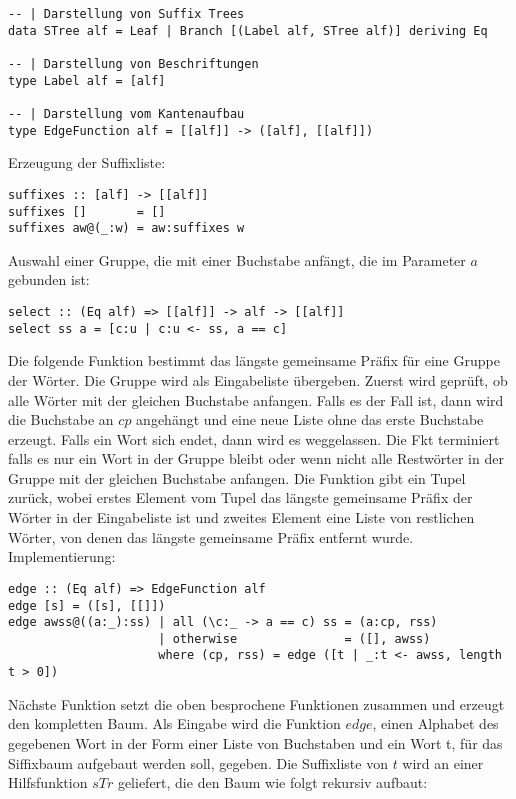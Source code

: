 \documentclass[12pt]{report}
\begin{document}
\begin{lstlisting}
-- | Darstellung von Suffix Trees
data STree alf = Leaf | Branch [(Label alf, STree alf)] deriving Eq

-- | Darstellung von Beschriftungen
type Label alf = [alf]

-- | Darstellung vom Kantenaufbau
type EdgeFunction alf = [[alf]] -> ([alf], [[alf]])
\end{lstlisting}

Erzeugung der Suffixliste:
\begin{lstlisting}
suffixes :: [alf] -> [[alf]]
suffixes []       = []
suffixes aw@(_:w) = aw:suffixes w
\end{lstlisting}

Auswahl einer Gruppe, die mit einer Buchstabe anfängt, die im Parameter $a$ gebunden ist:
\begin{lstlisting}
select :: (Eq alf) => [[alf]] -> alf -> [[alf]]
select ss a = [c:u | c:u <- ss, a == c]
\end{lstlisting}

Die folgende Funktion bestimmt das längste gemeinsame Präfix für eine Gruppe der Wörter. Die Gruppe wird als Eingabeliste übergeben. Zuerst wird geprüft, ob alle Wörter mit der gleichen Buchstabe anfangen. Falls es der Fall ist, dann wird die Buchstabe an $cp$ angehängt und eine neue Liste ohne das erste Buchstabe erzeugt. Falls ein Wort sich endet, dann wird es weggelassen. Die Fkt terminiert falls es nur ein Wort in der Gruppe bleibt oder wenn nicht alle Restwörter in der Gruppe mit der gleichen Buchstabe anfangen. Die Funktion gibt ein Tupel zurück, wobei erstes Element vom Tupel das längste gemeinsame Präfix der Wörter in der Eingabeliste ist und zweites Element eine Liste von restlichen Wörter, von denen das längste gemeinsame Präfix entfernt wurde. Implementierung:
\begin{lstlisting}
edge :: (Eq alf) => EdgeFunction alf
edge [s] = ([s], [[]])
edge awss@((a:_):ss) | all (\c:_ -> a == c) ss = (a:cp, rss)
                     | otherwise               = ([], awss)
                     where (cp, rss) = edge ([t | _:t <- awss, length t > 0])
\end{lstlisting}

Nächste Funktion setzt die oben besprochene Funktionen zusammen und erzeugt den kompletten Baum. Als Eingabe wird die Funktion $edge$, einen Alphabet des gegebenen Wort in der Form einer Liste von Buchstaben und ein Wort t, für das Siffixbaum aufgebaut werden soll, gegeben. Die Suffixliste von $t$ wird an einer Hilfsfunktion $sTr$ geliefert, die den Baum wie folgt rekursiv aufbaut:
\end{document}
